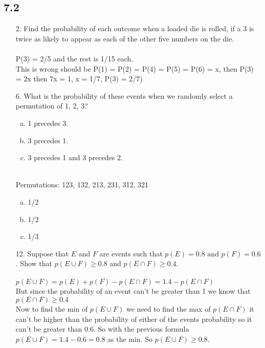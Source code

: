 \subsection{7.2}
\begin{itemize}
    \item[2.]  Find the probability of each outcome when a loaded die
          is rolled, if a 3 is twice as likely to appear as each of the
          other five numbers on the die. \\
          \answer \\
          P(3) = 2/5 and the rest is 1/15 each. \\
          {\color{red} This is wrong should be P(1) = P(2) = P(4) = P(5) = P(6) = x, then P(3) = 2x then 7x = 1, x = 1/7, P(3) = 2/7)}

    \item[6.]  What is the probability of these events when we randomly
          select a permutation of {1, 2, 3}?
          \begin{enumerate}[a.]
              \item 1 precedes 3.
              \item 3 precedes 1.
              \item 3 precedes 1 and 3 precedes 2.
          \end{enumerate}
          \answer \\
          Permutations: 123, 132, 213, 231, 312, 321
          \begin{enumerate}[a.]
              \item 1/2
              \item 1/2
              \item 1/3
          \end{enumerate}
    \item[12.] Suppose that $E$ and $F$ are events such that $p(E) =
              0.8 \text{ and } p(F) = 0.6$. Show that $p(E \cup F ) \geq 0.8$ and
          $p(E \cap F) \geq 0.4.$ \\
          \answer \\
          $p(E \cup F) = p(E) + p(F) - p(E \cap F) = 1.4 - p(E \cap F)$ \\
          But since the probability of an event can't be greater than 1 we know that
          $p(E \cap F) \geq  0.4$ \\
          Now to find the min of $p(E \cup F)$ we need to find the max of $p(E \cap F)$
          it can't be higher than the probability of either of the events probability so
          it can't be greater than 0.6. So with the previous formula $p(E \cup F) = 1.4 -0.6 = 0.8$
          as the min. So $p(E \cup F) \geq 0.8$.


\end{itemize}
